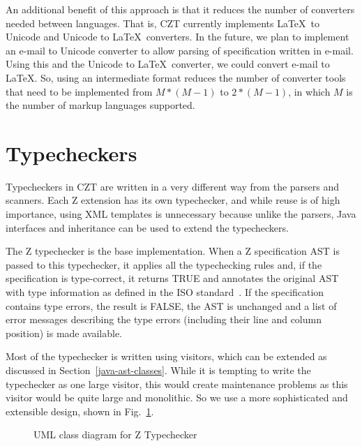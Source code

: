 \documentclass{llncs}
\begin{document}
An additional benefit of this approach is that it reduces the number
of converters needed between languages. That is, CZT currently
implements \LaTeX\ to Unicode and Unicode to \LaTeX\ converters. In
the future, we plan to implement an e-mail to Unicode converter to
allow parsing of specification written in e-mail. Using this and the
Unicode to \LaTeX\ converter, we could convert e-mail to \LaTeX. So,
using an intermediate format reduces the number of converter tools
that need to be implemented from $M*(M-1)$ to $2*(M-1)$, in which $M$
is the number of markup languages supported.


\section{Typecheckers}
\label{typecheckers}

Typecheckers in CZT are written in a very different way from the parsers
and scanners. Each Z extension has its own typechecker, and while reuse
is of high importance, using XML templates is unnecessary because
unlike the parsers, Java interfaces and inheritance can be used to
extend the typecheckers.

The Z typechecker is the base implementation.  When a Z specification
AST is passed to this typechecker, it applies all the typechecking
rules and, if the specification is type-correct, it returns TRUE and
annotates the original AST with type information as defined in the ISO
standard~\cite[Section~10]{isoz}.  If the specification contains type errors,
the result is FALSE, the AST is unchanged and a list of error messages
describing the type errors (including their line and column position)
is made available.

Most of the typechecker is written using visitors, which can be
extended as discussed in Section~\ref{java-ast-classes}.  While it is
tempting to write the typechecker as one large visitor, this would
create maintenance problems as this visitor would be quite large and
monolithic.  So we use a more sophisticated and extensible design,
shown in Fig.~\ref{fig:ztypechecker}.

\def\epsfsize#1#2{0.50#1}
\begin{figure}[t]
\begin{center}
\caption{UML class diagram for Z Typechecker}\label{fig:ztypechecker}
\end{center}
\end{figure}
\def\epsfsize#1#2{\epsfxsize}
\end{document}
